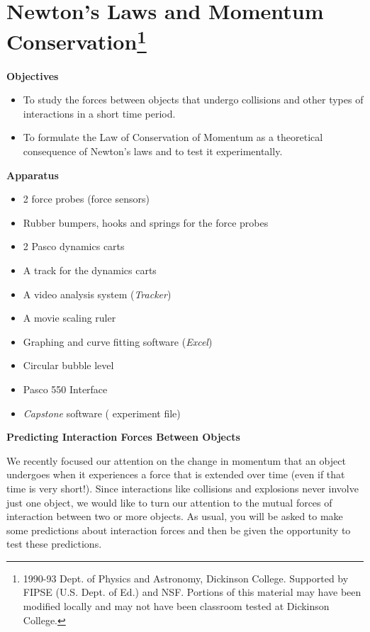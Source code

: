 
\section{Newton's Laws and Momentum Conservation\footnote{
1990-93 Dept. of Physics and Astronomy, Dickinson College. Supported by FIPSE
(U.S. Dept. of Ed.) and NSF. Portions of this material may have been modified
locally and may not have been classroom tested at Dickinson College.
}}

\makelabheader %

\bigskip
\textbf{Objectives }

\begin{itemize}[nosep]
\item To study the forces between objects that undergo collisions and other types
of interactions in a short time period. 
\item To formulate the Law of Conservation of Momentum as a theoretical consequence
of Newton's laws and to test it experimentally.
\end{itemize}

\bigskip
\textbf{Apparatus}

\begin{itemize}[nosep]
\item 2 force probes (force sensors)
\item Rubber bumpers, hooks and springs for the force probes
\item 2 Pasco dynamics carts
\item A track for the dynamics carts
\item A video analysis system (\textit{Tracker})
\item A movie scaling ruler
\item Graphing and curve fitting software (\textit{Excel})
\item Circular bubble level
\item Pasco 550 Interface
\item \textit{Capstone} software ( experiment file)
\end{itemize}
\textbf{Predicting Interaction Forces Between Objects} 

We recently focused our attention on the change in momentum that an object undergoes
when it experiences a force that is extended over time (even if that time is
very short!). Since interactions like collisions and explosions never involve
just one object, we would like to turn our attention to the mutual forces of
interaction between two or more objects. As usual, you will be asked to make
some predictions about interaction forces and then be given the opportunity
to test these predictions. 

